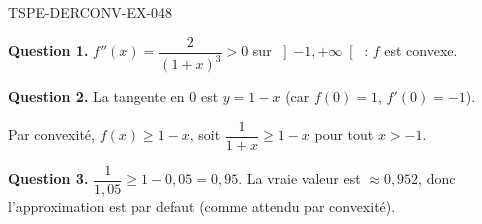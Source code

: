 \begin{corrige}{TSPE-DERCONV-EX-048}

\textbf{Question 1.} $f''(x) = \dfrac{2}{(1+x)^3} > 0$ sur $\left]-1, +\infty\right[$ : $f$ est convexe.

\commentaireMarge{$f''=2/(1+x)^3 > 0$ sur $]-1,+\infty[$ : convexe, courbe au-dessus des tangentes.}

\textbf{Question 2.} La tangente en $0$ est $y = 1 - x$ (car $f(0)=1$, $f'(0)=-1$).

Par convexité, $f(x) \geq 1 - x$, soit $\dfrac{1}{1+x} \geq 1 - x$ pour tout $x > -1$.

\textbf{Question 3.} $\dfrac{1}{1{,}05} \geq 1 - 0{,}05 = 0{,}95$. La vraie valeur est $\approx 0{,}952$, donc l'approximation est par defaut (comme attendu par convexité).

\end{corrige}
